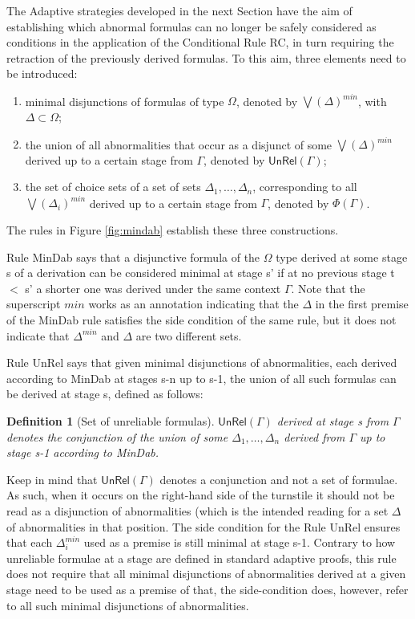 \documentclass[]{article}
\newtheorem{definition}{Definition}
\newcommand{\Unrel}{\ensuremath{\mathsf{UnRel}}}
\begin{document}
The Adaptive strategies developed in the next Section have the aim of establishing which abnormal formulas can no longer be safely considered as conditions in the application of the Conditional Rule {\sf RC}, in turn requiring the retraction of the previously derived formulas. To this aim, three elements need to be introduced:

\begin{enumerate}
\item minimal disjunctions of formulas of type $\Omega$, denoted by $\bigvee(\Delta)^{min}$, with $\Delta \subset \Omega$;
\item the union of all abnormalities that occur as a disjunct of some $\bigvee(\Delta)^{min}$ derived up to a certain stage from $\Gamma$, denoted by $\Unrel(\Gamma)$;
\item the set of choice sets of a set of sets $\Delta_1, \ldots, \Delta_n$, corresponding to all $\bigvee(\Delta_i)^{min}$ derived up to a certain stage from $\Gamma$, denoted by $\Phi(\Gamma)$.
\end{enumerate}

The rules in Figure \ref{fig:mindab} establish these three constructions.

Rule {\sf MinDab} says that a disjunctive formula of the $\Omega$ type derived at some stage {\sf s} of a derivation can be considered minimal at stage {\sf s'} if at no previous stage {\sf t} $<$ {\sf s'} a shorter one was derived under the same context $\Gamma$. Note that the superscript $min$ works as an annotation indicating that the $\Delta$ in the first premise of the {\sf MinDab} rule satisfies the side condition of the same rule, but it does not indicate that $\Delta^{min}$ and $\Delta$ are two different sets.

Rule {\sf UnRel} says that given minimal disjunctions of abnormalities, each derived according to {\sf MinDab} at stages {\sf s-n} up to {\sf s-1}, the union of all such formulas can be derived at stage {\sf s}, defined as follows:

\begin{definition}[Set of unreliable formulas]
$\Unrel(\Gamma)$ derived at stage {\sf s} from $\Gamma$ denotes the conjunction of the union of some $\Delta_{1}, \dots, \Delta_{n}$ derived from $\Gamma$ up to stage {\sf s-1} according to {\sf MinDab}.
\end{definition}
Keep in mind that $\Unrel(\Gamma)$ denotes a conjunction and not a set of formulae. As such, when it occurs on the right-hand side of the turnstile it should not be read as a disjunction of abnormalities (which is the intended reading for a set $\Delta$ of abnormalities in that position. The side condition for the Rule {\sf UnRel} ensures that each $\Delta_{i}^{min}$ used as a premise is still minimal at stage {\sf s-1}. Contrary to how unreliable formulae at a stage are defined in standard adaptive proofs, this rule does not require that all minimal disjunctions of abnormalities derived at a given stage need to be used as a premise of that, the side-condition does, however, refer to all such minimal disjunctions of abnormalities.
\end{document}
